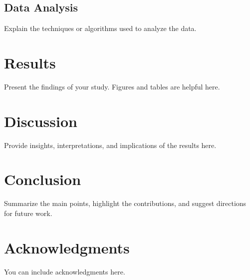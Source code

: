 \documentclass[12pt]{article}
\begin{document}
\subsection{Data Analysis}
Explain the techniques or algorithms used to analyze the data.

\section{Results}
Present the findings of your study. Figures and tables are helpful here.



\section{Discussion}
Provide insights, interpretations, and implications of the results here.

\section{Conclusion}
Summarize the main points, highlight the contributions, and suggest directions for future work.

\section*{Acknowledgments}
You can include acknowledgments here.



\end{document}
